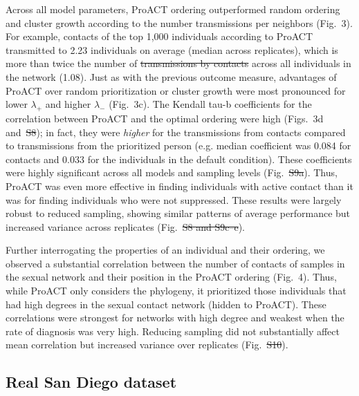 \documentclass[a4paper,11pt]{article}
\newcommand{\PLWH}{sample\xspace}
\providecommand{\DIFadd}[1]{{\protect\color{blue}\uwave{#1}}} %
\providecommand{\DIFdel}[1]{{\protect\color{red}\sout{#1}}}                      %
\providecommand{\DIFaddbegin}{} %
\providecommand{\DIFaddend}{} %
\providecommand{\DIFdelbegin}{} %
\providecommand{\DIFdelend}{} %
\begin{document}
Across all model parameters, ProACT ordering outperformed random ordering and cluster growth according to the number transmissions per neighbors (Fig.~3).
For example, contacts of the top 1,000 individuals according to ProACT transmitted to 2.23 individuals on average (median across replicates), which is more than twice the number of \DIFdelbegin \DIFdel{transmissions by contacts }\DIFdelend across all individuals in the network (1.08).
Just as with the previous outcome measure, advantages of ProACT over random prioritization or cluster growth were most pronounced for lower $\lambda_{+}$ and higher $\lambda_{-}$ (Fig.~3c). 
The Kendall tau-b coefficients for the correlation between ProACT and the optimal ordering were high (Figs.~3d and~\DIFdelbegin \DIFdel{S8}\DIFdelend \DIFaddbegin \DIFadd{S10}\DIFaddend ); in fact, they were \textit{higher} for the transmissions from contacts compared to transmissions from the prioritized person (e.g. median coefficient was 0.084 for contacts and 0.033 for the individuals in the default condition). 
These coefficients were highly significant across all models and sampling levels (Fig.~\DIFdelbegin \DIFdel{S9a}\DIFdelend \DIFaddbegin \DIFadd{S11}\DIFaddend ).
Thus, ProACT was even more effective in finding individuals with active contact than it was for finding individuals who were not suppressed. 
These results were largely robust to reduced sampling, showing similar patterns of average performance but increased variance across replicates (Fig.~\DIFdelbegin \DIFdel{S8 and S9c--e}\DIFdelend \DIFaddbegin \DIFadd{S10 and S11}\DIFaddend ).

Further interrogating the properties of an individual and their ordering, we observed a substantial correlation between the number of contacts of \PLWH{s} in the sexual network and their position in the ProACT ordering (Fig.~4). 
Thus, while ProACT only considers the phylogeny, it  prioritized those individuals that had high degrees in the sexual contact network (hidden to ProACT). 
These correlations were strongest for networks with high degree and weakest when the rate of diagnosis was very high. 
Reducing sampling did not substantially affect mean correlation but increased variance over replicates (Fig.~\DIFdelbegin \DIFdel{S10}\DIFdelend \DIFaddbegin \DIFadd{S12}\DIFaddend ).





\subsection{Real San Diego dataset}
\end{document}
